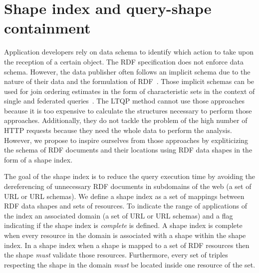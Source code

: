 \section{Shape index and query-shape containment}



Application developers rely on data schema to identify which action to take upon the reception of a certain object.
The RDF specification does not enforce data schema.
However, the data publisher often follows an implicit schema due to the nature of their data and the formulation of RDF~\cite{Neumann2011CharacteristicSA}.
Those implicit schemas can be used  for join ordering estimates in the form of characteristic sets in the context of single and federated queries~\cite{Neumann2011CharacteristicSA, Meimaris2017ExtendedCS, Meimaris2018HierarchicalCS}.
The LTQP method cannot use those approaches because it is too expensive to calculate the structures necessary to perform those approaches.
Additionally, they do not tackle the problem of the high number of HTTP requests because they need the whole data to perform the analysis.
However, we propose to inspire ourselves from those approaches by expliticizing the schema of RDF documents and their locations using RDF data shapes in the form of a shape index.

The goal of the shape index is to reduce the query execution time by avoiding the dereferencing of unnecessary RDF documents in subdomains of the web (a set of URL or URL schemas).
We define a shape index as a set of mappings between RDF data shapes and sets of resources.
To indicate the range of applications of the index an associated domain (a set of URL or URL schemas) and a flag indicating if the shape index is \emph{complete} is defined.
A shape index is complete when every resource in the domain is associated with a shape within the shape index.
In a shape index when a shape is mapped to a set of RDF resources then the shape \emph{must} validate those resources.
Furthermore, every set of triples respecting the shape in the domain \emph{must} be located inside one resource of the set.

